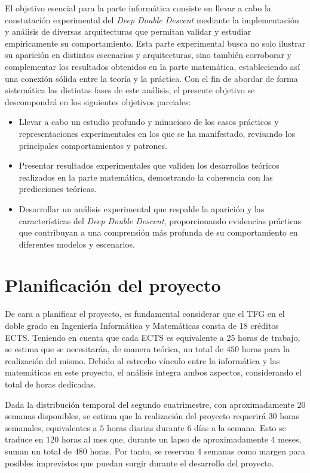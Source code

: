 El objetivo esencial para la parte informática consiste en llevar a cabo la constatación experimental del \textit{Deep Double Descent} mediante la implementación y análisis de diversas arquitecturas que permitan validar y estudiar empíricamente su comportamiento. Esta parte experimental busca no solo ilustrar su aparición en distintos escenarios y arquitecturas, sino también corroborar y complementar los resultados obtenidos en la parte matemática, estableciendo así una conexión sólida entre la teoría y la práctica. Con el fin de abordar de forma sistemática las distintas fases de este análisis, el presente objetivo se descompondrá en los siguientes objetivos parciales:

\begin{itemize}
    \item Llevar a cabo un estudio profundo y minucioso de los casos prácticos y representaciones experimentales en los que se ha manifestado, revisando los principales comportamientos y patrones.
    \item Presentar resultados experimentales que validen los desarrollos teóricos realizados en la parte matemática, demostrando la coherencia con las predicciones teóricas.
    \item Desarrollar un análisis experimental que respalde la aparición y las características del \textit{Deep Double Descent}, proporcionando evidencias prácticas que contribuyan a una comprensión más profunda de su comportamiento en diferentes modelos y escenarios.\newline
\end{itemize}

\section{Planificación del proyecto}

De cara a planificar el proyecto, es fundamental considerar que el TFG en el doble grado en Ingeniería Informática y Matemáticas consta de 18 créditos ECTS. Teniendo en cuenta que cada ECTS es equivalente a 25 horas de trabajo, se estima que se necesitarán, de manera teórica, un total de $450$ horas para la realización del mismo. Debido al estrecho vínculo entre la informática y las matemáticas en este proyecto, el análisis integra ambos aspectos, considerando el total de horas dedicadas.\newline

Dada la distribución temporal del segundo cuatrimestre, con aproximadamente 20 semanas disponibles, se estima que la realización del proyecto requerirá $30$ horas semanales, equivalentes a $5$ horas diarias durante $6$ días a la semana. Esto se traduce en $120$ horas al mes que, durante un lapso de aproximadamente 4 meses, suman un total de $480$ horas. Por tanto, se reservan 4 semanas como margen para posibles imprevistos que puedan surgir durante el desarrollo del proyecto.\newline

